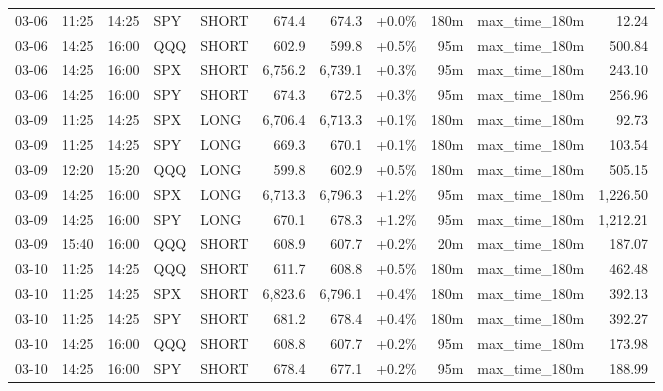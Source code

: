 \documentclass[11pt,a4paper,twoside]{article}
\begin{document}
\begin{center}
\begin{longtable}{>{\color{txtmain}}l l l l l r r r r >{\color{txtmain}}l r}
03-06 & 11:25 & 14:25 & SPY & SHORT & 674.4 & 674.3 & \textcolor{wingreen}{+0.0\%} & 180m & max\_time\_180m & \textcolor{wingreen}{12.24} \\
03-06 & 14:25 & 16:00 & QQQ & SHORT & 602.9 & 599.8 & \textcolor{wingreen}{+0.5\%} & 95m & max\_time\_180m & \textcolor{wingreen}{500.84} \\
03-06 & 14:25 & 16:00 & SPX & SHORT & 6,756.2 & 6,739.1 & \textcolor{wingreen}{+0.3\%} & 95m & max\_time\_180m & \textcolor{wingreen}{243.10} \\
03-06 & 14:25 & 16:00 & SPY & SHORT & 674.3 & 672.5 & \textcolor{wingreen}{+0.3\%} & 95m & max\_time\_180m & \textcolor{wingreen}{256.96} \\
03-09 & 11:25 & 14:25 & SPX & LONG & 6,706.4 & 6,713.3 & \textcolor{wingreen}{+0.1\%} & 180m & max\_time\_180m & \textcolor{wingreen}{92.73} \\
03-09 & 11:25 & 14:25 & SPY & LONG & 669.3 & 670.1 & \textcolor{wingreen}{+0.1\%} & 180m & max\_time\_180m & \textcolor{wingreen}{103.54} \\
03-09 & 12:20 & 15:20 & QQQ & LONG & 599.8 & 602.9 & \textcolor{wingreen}{+0.5\%} & 180m & max\_time\_180m & \textcolor{wingreen}{505.15} \\
03-09 & 14:25 & 16:00 & SPX & LONG & 6,713.3 & 6,796.3 & \textcolor{wingreen}{+1.2\%} & 95m & max\_time\_180m & \textcolor{wingreen}{1,226.50} \\
03-09 & 14:25 & 16:00 & SPY & LONG & 670.1 & 678.3 & \textcolor{wingreen}{+1.2\%} & 95m & max\_time\_180m & \textcolor{wingreen}{1,212.21} \\
03-09 & 15:40 & 16:00 & QQQ & SHORT & 608.9 & 607.7 & \textcolor{wingreen}{+0.2\%} & 20m & max\_time\_180m & \textcolor{wingreen}{187.07} \\
03-10 & 11:25 & 14:25 & QQQ & SHORT & 611.7 & 608.8 & \textcolor{wingreen}{+0.5\%} & 180m & max\_time\_180m & \textcolor{wingreen}{462.48} \\
03-10 & 11:25 & 14:25 & SPX & SHORT & 6,823.6 & 6,796.1 & \textcolor{wingreen}{+0.4\%} & 180m & max\_time\_180m & \textcolor{wingreen}{392.13} \\
03-10 & 11:25 & 14:25 & SPY & SHORT & 681.2 & 678.4 & \textcolor{wingreen}{+0.4\%} & 180m & max\_time\_180m & \textcolor{wingreen}{392.27} \\
03-10 & 14:25 & 16:00 & QQQ & SHORT & 608.8 & 607.7 & \textcolor{wingreen}{+0.2\%} & 95m & max\_time\_180m & \textcolor{wingreen}{173.98} \\
03-10 & 14:25 & 16:00 & SPY & SHORT & 678.4 & 677.1 & \textcolor{wingreen}{+0.2\%} & 95m & max\_time\_180m & \textcolor{wingreen}{188.99} \\

\end{longtable}
\end{center}
\end{document}
